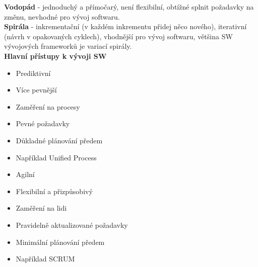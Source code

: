 \documentclass[11pt,a4paper]{article}
\begin{document}
        \textbf{Vodopád} - jednoduchý a přímočarý, není flexibilní, obtížné splnit požadavky na změnu, nevhodné pro vývoj softwaru.\\
        \textbf{Spirála} - inkrementační (v každém inkrementu přidej něco nového), iterativní (návrh v opakovaných cyklech), vhodnější pro vývoj softwaru, většina SW vývojových frameworků je variací spirály.\\
        \textbf{Hlavní přístupy k vývoji SW}
        \begin{multicols}{2}
        \begin{itemize}
            \item Prediktivní
            \item Více pevnější
            \item Zaměření na procesy
            \item Pevné požadavky
            \item Důkladné plánování předem
            \item Například Unified Process
            \item Agilní
            \item Flexibilní a přizpůsobivý
            \item Zaměření na lidi
            \item Pravidelně aktualizované požadavky
            \item Minimální plánování předem
            \item Například SCRUM
        \end{itemize}
        \end{multicols}
\end{document}
